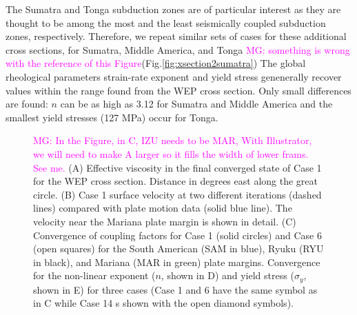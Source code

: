 \documentclass[12pt]{article}
\newcommand{\mgnote}[1]{\textcolor{magenta}{MG: #1}}
\begin{document}
{The Sumatra and Tonga subduction zones are of particular interest as they are thought to be among the most and the least seismically coupled subduction zones, respectively.
Therefore, we repeat similar sets of cases for these additional cross sections, for Sumatra, Middle America, and Tonga \mgnote{something is wrong with the reference of this Figure}(Fig.\ref{fig:xsection2sumatra})
The global rheological parameters strain-rate exponent and yield stress genenerally recover values within the range found from the WEP cross section. Only small differences are found: $n$ can be as high as 3.12 for Sumatra and Middle America and the smallest yield stresses (127 MPa) occur for Tonga.



\begin{figure}[H]
\centering

\hspace{-0.2cm}

\caption{ \mgnote{In the Figure, in C, IZU needs to be MAR, With Illustrator, we will need to make A larger so it fills the width of lower frams. See me.}
(A) Effective viscosity in the final converged state of Case 1 for the WEP cross section. Distance in degrees east along the great circle.
(B) Case 1 surface velocity at two different iterations (dashed lines) compared with plate motion data (solid blue line). The velocity near the Mariana plate margin is shown in detail.
(C) Convergence of coupling factors  for Case 1 (solid circles) and Case 6 (open squares) for the South American (SAM in blue), Ryuku (RYU in black), and Mariana (MAR in green) plate margins. 
Convergence for the non-linear exponent ($n$, shown in D)  and yield stress ($\sigma_y$, shown in E) for three cases (Case 1 and 6 have the same symbol as in C while Case 14 s shown with the open diamond symbols).
}
\label{fig:inverse1}
\end{figure}


\begin{figure}[H]
\centering

\hspace{-1.0cm}


\end{figure}}
\end{document}
